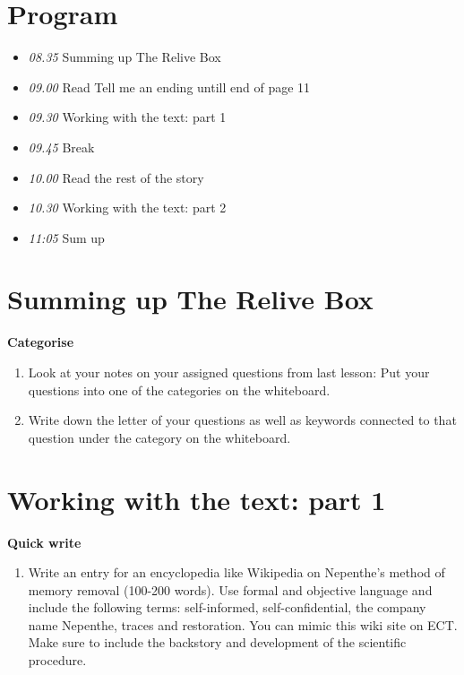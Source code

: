 \documentclass[11pt,a4paper,oneside]{book}
\newcommand{\tasktitle}[1]{{\color{blue}\bfseries #1}\par\smallskip}
\begin{document}
\section*{Program}

\begin{itemize}
\item \emph{08.35} Summing up The Relive Box
\item \emph{09.00} Read Tell me an ending untill end of page 11
\item \emph{09.30} Working with the text: part 1
\item \emph{09.45} Break
\item \emph{10.00} Read the rest of the story
\item \emph{10.30} Working with the text: part 2
\item \emph{11:05} Sum up
\end{itemize}

\section*{Summing up The Relive Box}
\begin{taskbox}
\tasktitle{Categorise}
\begin{enumerate}
\item Look at your notes on your assigned questions from last lesson: Put your questions into one of the categories on the whiteboard.
\item Write down the letter of your questions as well as keywords connected to that question under the category on the whiteboard.
\end{enumerate}
\end{taskbox}

\section*{Working with the text: part 1}
\begin{taskbox}
\tasktitle{Quick write}
\begin{enumerate}
\item Write an entry for an encyclopedia like Wikipedia on Nepenthe’s method of memory removal (100-200 words). Use formal and objective language and include the following terms: self-informed, self-confidential, the company name Nepenthe, traces and restoration. You can mimic this wiki site on ECT.
Make sure to include the backstory and development of the scientific procedure.
\end{enumerate}
\end{taskbox}
\end{document}
